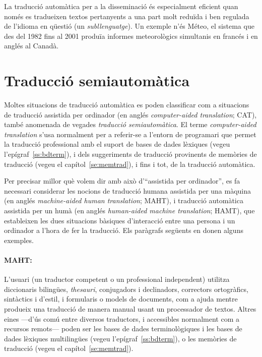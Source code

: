 La traducció automàtica per a la disseminació és especialment eficient
quan només es tradueixen textos pertanyents a una part molt reduïda i
ben regulada de l'idioma en qüestió (un \emph{subllenguatge}).  Un
exemple n'és Méteo, el sistema que des del 1982 fins al 2001 produïa
informes meteorològics simultanis en francés i en anglés al Canadà.

\section{Traducció semiautomàtica} 
\label{se:cat}
Moltes situacions de traducció automàtica es poden classificar com a
situacions de traducció assistida per ordinador (en anglés
\emph{computer-aided translation}; CAT), també anomenada de vegades
\emph{traducció semiautomàtica}.  El terme \emph{computer-aided
  translation} s'usa normalment per a referir-se a l'entorn de
programari que permet la traducció professional amb el suport de bases
de dades lèxiques (vegeu l'epígraf~\ref{ss:bdterm}), i dels
suggeriments de traducció provinents de memòries de traducció (vegeu
el capítol~\ref{se:memtrad}), i fins i tot, de la traducció
automàtica.

Per precisar millor què volem dir amb això d'``assistida per
ordinador'', es fa necessari considerar les nocions de traducció
humana assistida per una màquina (en anglés \emph{machine-aided human
  translation}; MAHT), i traducció automàtica assistida per un humà
(en anglés \emph{human-aided machine translation}; HAMT), que
estableixen les dues situacions bàsiques d'interacció entre una
persona i un ordinador a l'hora de fer la traducció. Els paràgrafs
següents en donen alguns exemples.

\paragraph{MAHT:} L'usuari (un traductor competent o un professional
independent) utilitza diccionaris bilingües, \emph{thesauri},
conjugadors i declinadors, correctors ortogràfics, sintàctics i
d'estil, i formularis o models de documents, com a ajuda mentre
produeix una traducció de manera manual usant un processador de
textos. Altres eines ---d'ús comú entre diversos traductors, i
accessibles normalment com a recursos remots--- poden ser les bases de
dades terminològiques i les bases de dades lèxiques multilingües
(vegeu l'epígraf~\ref{ss:bdterm}), o les memòries de traducció (vegeu
el capítol~\ref{se:memtrad}). 

